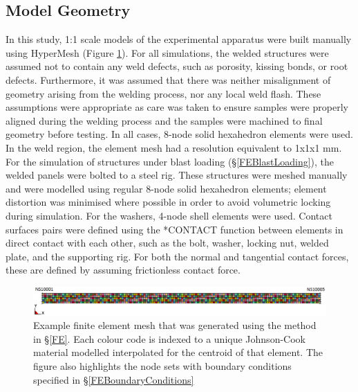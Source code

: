 \subsection{Model Geometry}
\label{FEModelGeometry}
In this study, 1:1 scale models of the experimental apparatus were built manually using HyperMesh (Figure \ref{fig:UniaxialMesh}). For all simulations, the welded structures were assumed not to contain any weld defects, such as porosity, kissing bonds, or root defects. Furthermore, it was assumed that there was neither misalignment of geometry arising from the welding process, nor any local weld flash. These assumptions were appropriate as care was taken to ensure samples were properly aligned during the welding process and the samples were machined to final geometry before testing. In all cases, 8-node solid hexahedron elements were used. In the weld region, the element mesh had a resolution equivalent to 1x1x1 mm. 
For the simulation of structures under blast loading (\S\ref{FEBlastLoading}), the welded panels were bolted to a steel rig. These structures were meshed manually and were modelled using regular 8-node solid hexahedron elements; element distortion was minimised where possible in order to avoid volumetric locking during simulation. For the washers, 4-node shell elements were used. Contact surfaces pairs were defined using the *CONTACT function between elements in direct contact with each other, such as the bolt, washer, locking nut, welded plate, and the supporting rig. For both the normal and tangential contact forces, these are defined by assuming frictionless contact force. 
\begin{figure}[h!]
	\centering
	\includegraphics[width=1\linewidth]{uniaxial_load}
	\caption[Mesh]{Example finite element mesh that was generated using the method in \S \ref{FE}. Each colour code is indexed to a unique Johnson-Cook material modelled interpolated for the centroid of that element. The figure also highlights the node sets with boundary conditions specified in \S \ref{FEBoundaryConditions}}	
	\label{fig:UniaxialMesh}
\end{figure} 
